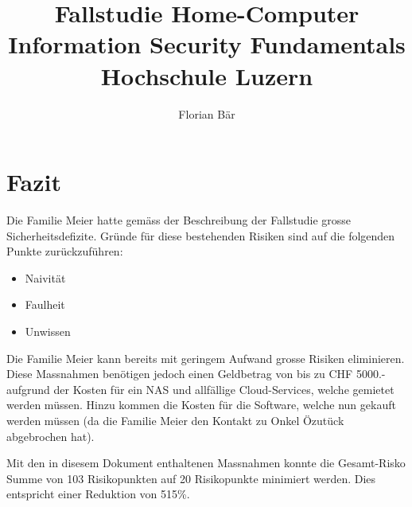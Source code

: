 \documentclass{article}
\begin{document}
\title{%
	Fallstudie Home-Computer \\
	\large Information Security Fundamentals \\
	Hochschule Luzern}

\author{Florian Bär}
\maketitle
\thispagestyle{empty}
\clearpage
\setcounter{page}{1}

\tableofcontents



\newpage










\section{Fazit}

Die Familie Meier hatte gemäss der Beschreibung der Fallstudie grosse Sicherheitsdefizite. Gründe für diese bestehenden Risiken sind auf die folgenden Punkte zurückzuführen:
\begin{itemize}
	\item Naivität
	\item Faulheit
	\item Unwissen
\end{itemize}
Die Familie Meier kann bereits mit geringem Aufwand grosse Risiken eliminieren. Diese Massnahmen benötigen jedoch einen Geldbetrag von bis zu CHF 5000.- aufgrund der Kosten für ein NAS und allfällige Cloud-Services, welche gemietet werden müssen. Hinzu kommen die Kosten für die Software, welche nun gekauft werden müssen (da die Familie Meier den Kontakt zu Onkel Özutück abgebrochen hat).

Mit den in disesem Dokument enthaltenen Massnahmen konnte die Gesamt-Risko Summe von 103 Risikopunkten auf 20 Risikopunkte minimiert werden. Dies entspricht einer Reduktion von 515\%. 
\end{document}
